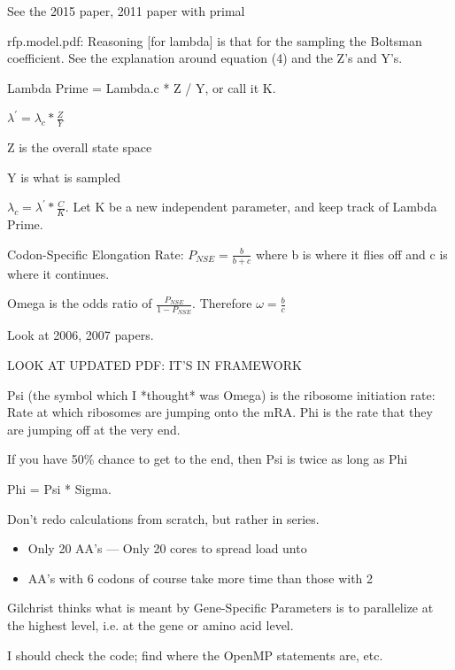 \documentclass[12pt,hyperref]{labbook}
\begin{document}
See the 2015 paper, 2011 paper with primal



rfp.model.pdf:
Reasoning [for lambda] is that for the sampling the Boltsman coefficient. See the explanation around equation (4) and the Z’s and Y’s.

Lambda Prime = Lambda.c * Z / Y, or call it K.

$\lambda^{\prime} = \lambda_c * \frac{Z}{Y}$

Z is the overall state space

Y is what is sampled

$\lambda_c = \lambda^{\prime} * \frac{C}{K}$. Let K be a new independent parameter, and keep track of Lambda Prime.



Codon-Specific Elongation Rate:
$P_{NSE} = \frac{b}{b + c}$ where b is where it flies off and c is where it continues.

Omega is the odds ratio of $\frac{P_{NSE}}{1 - P_{NSE}}$. Therefore $\omega = \frac{b}{c}$

Look at 2006, 2007 papers.

LOOK AT UPDATED PDF: IT’S IN FRAMEWORK

Psi (the symbol which I *thought* was Omega)
is the ribosome initiation rate: Rate at which ribosomes are jumping onto the mRA. Phi is the rate that they are jumping off at the very end.

If you have 50\% chance to get to the end, then Psi is twice as long as Phi

Phi = Psi * Sigma.

Don’t redo calculations from scratch, but rather in series.


\begin{itemize}
    \item Only 20 AA’s — Only 20 cores to spread load unto
    \item AA’s with 6 codons of course take more time than those with 2
\end{itemize}

Gilchrist thinks what is meant by Gene-Specific Parameters is to parallelize at the highest level, 
i.e. at the gene or amino acid level.

I should check the code; find where the OpenMP statements are, etc.
\end{document}
